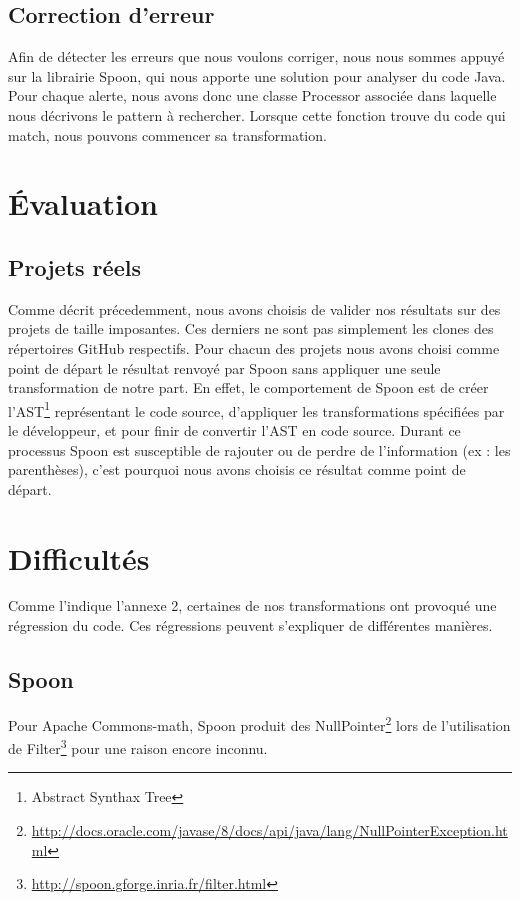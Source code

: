 \documentclass[a4paper]{article}
\begin{document}
\subsection{Correction d'erreur}
\par Afin de détecter les erreurs que nous voulons corriger, nous nous sommes appuyé sur la librairie Spoon, qui nous apporte une solution pour analyser du code Java. Pour chaque alerte, nous avons donc une classe Processor associée dans laquelle nous décrivons le pattern à rechercher. Lorsque cette fonction trouve du code qui match, nous pouvons commencer sa transformation.


\section{Évaluation}
\subsection{Projets réels}
\par Comme décrit précedemment, nous avons choisis de valider nos résultats sur des projets de taille imposantes. Ces derniers ne sont pas simplement les clones des répertoires GitHub respectifs. Pour chacun des projets nous avons choisi comme point de départ le résultat renvoyé par Spoon sans appliquer une seule transformation de notre part. En effet, le comportement de Spoon est de créer l'AST\footnote{Abstract Synthax Tree} représentant le code source, d'appliquer les transformations spécifiées par le développeur, et pour finir de convertir l'AST en code source. Durant ce processus Spoon est susceptible de rajouter ou de perdre de l'information (ex : les parenthèses), c'est pourquoi nous avons choisis ce résultat comme point de départ.


\section{Difficultés}
\par Comme l'indique l'annexe 2, certaines de nos transformations ont provoqué une régression du code. Ces régressions peuvent s'expliquer de différentes manières.

\subsection{Spoon}
\par Pour Apache Commons-math, Spoon produit des NullPointer\footnote{\url{http://docs.oracle.com/javase/8/docs/api/java/lang/NullPointerException.html}} lors de l'utilisation de Filter\footnote{\url{http://spoon.gforge.inria.fr/filter.html}} pour une raison encore inconnu.
\end{document}
